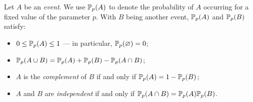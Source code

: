 \documentclass[a4paper, 12pt]{article}
\begin{document}
%
%
%
%
\begin{defn}\label{def:event_prob}
Let $A$ be an \textit{event}. We use $\mathbb{P}_p(A)$ to denote the probability of $A$ occurring for a fixed value of the parameter $p$. With $B$ being another event, $\mathbb{P}_p(A)$ and $\mathbb{P}_p(B)$ satisfy:
\begin{itemize}
    \item $0 \leq \mathbb{P}_p(A) \leq 1$ --- in particular, $\mathbb{P}_p(\varnothing) = 0$;
    \item $\mathbb{P}_p(A \cup B) = \mathbb{P}_p(A) + \mathbb{P}_p(B) - \mathbb{P}_p(A \cap B)$;
    \item $A$ is the \textit{complement} of $B$ if and only if $\mathbb{P}_p(A) = 1 - \mathbb{P}_p(B)$;
    \item $A$ and $B$ are \textit{independent} if and only if $\mathbb{P}_p(A \cap B) = \mathbb{P}_p(A) \mathbb{P}_p(B)$.
\end{itemize}
\end{defn}
\end{document}
